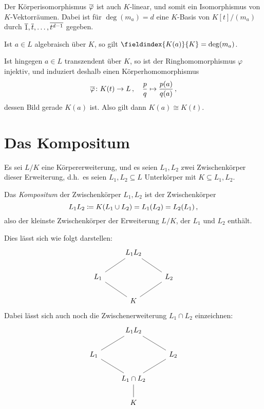 Der Körperisomorphismus $\overline{\varphi}$ ist auch $K$-linear, und somit ein Isomorphismus von $K$-Vektorräumen.
Dabei ist für $\deg(m_a) = d$ eine $K$-Basis von $K[t]/(m_a)$ durch $\overline{1}, \overline{t}, \dotsc, \overline{t^{d-1}}$ gegeben.

\begin{corollary}
  Ist $a \in L$ algebraisch über $K$, so gilt $\fieldindex{K(a)}{K} = \deg(m_a)$.
\end{corollary}

Ist hingegen $a \in L$ transzendent über $K$, so ist der Ringhomomorphismus $\varphi$ injektiv, und induziert deshalb einen Körperhomomorphismus
\[
          \overline{\varphi}
  \colon  K(t)
  \to     L \,,
  \quad   \frac{p}{q}
  \mapsto \frac{p(a)}{q(a)} \,,
\]
dessen Bild gerade $K(a)$ ist.
Also gilt dann $K(a) \cong K(t)$.





\section{Das Kompositum}

Es sei $L/K$ eine Körpererweiterung, und es seien $L_1, L_2$ zwei Zwischenkörper dieser Erweiterung, d.h.\ es seien $L_1, L_2 \subseteq L$ Unterkörper mit $K \subseteq L_1, L_2$.


\begin{definition}
  Das \emph{Kompositum} der Zwischenkörper $L_1, L_2$ ist der Zwischenkörper
  \[
              L_1 L_2
    \coloneqq  K(L_1 \cup L_2)
    =         L_1(L_2)
    =         L_2(L_1) \,,
  \]
  also der kleinste Zwischenkörper der Erweiterung $L/K$, der $L_1$ und $L_2$ enthält.
\end{definition}

Dies lässt sich wie folgt darstellen:
\[
  \begin{tikzcd}
      {}
    & L_1 L_2
    & {}
    \\
      L_1
      \arrow[-]{ru}
    & {}
    & L_2
      \arrow[-]{lu}
    \\
      {}
    & K
      \arrow[-]{lu}
      \arrow[-]{ru}
    & {}
  \end{tikzcd}
\]
Dabei lässt sich auch noch die Zwischenerweiterung $L_1 \cap L_2$ einzeichnen:
\[
  \begin{tikzcd}
      {}
    & L_1 L_2
    & {}
    \\
      L_1
      \arrow[-]{ru}
    & {}
    & L_2
      \arrow[-]{lu}
    \\
      {}
    & L_1 \cap L_2
      \arrow[-]{lu}
      \arrow[-]{ru}
    & {}
    \\
      {}
    & K
      \arrow[-]{u}
    & {}
  \end{tikzcd}
\]


